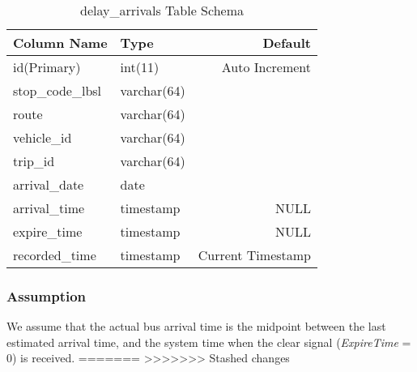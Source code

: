 \begin{table}
\centering
\begin{tabular}{@{}llr@{}} \toprule
Column Name & Type & Default \\ \midrule
id(Primary) & int(11) & Auto Increment \\
stop\_code\_lbsl & varchar(64) &  \\
route & varchar(64) &  \\
vehicle\_id & varchar(64) & \\
trip\_id & varchar(64) & \\
arrival\_date & date &  \\
arrival\_time & timestamp & NULL \\
expire\_time & timestamp & NULL \\
recorded\_time & timestamp & Current Timestamp \\ \bottomrule
\end{tabular}
\caption{delay\_arrivals Table Schema}
\label{table:delay_arrivals_schema}
\end{table}

\subsubsection{Assumption}
We assume that the actual bus arrival time is the midpoint between the last estimated arrival time, and the system time when the clear signal (\textit{ExpireTime} = 0) is received.
=======
>>>>>>> Stashed changes
